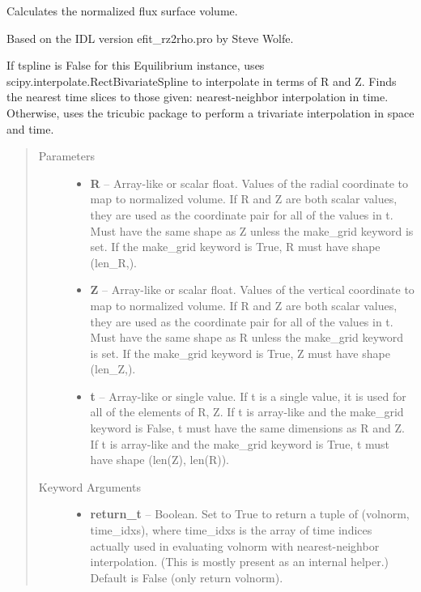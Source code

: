 \documentclass[letterpaper,10pt,english]{sphinxmanual}
\begin{document}
\begin{fulllineitems}

\begin{fulllineitems}
\label{eqtools:eqtools.core.Equilibrium.rz2volnorm}
Calculates the normalized flux surface volume.

Based on the IDL version efit\_rz2rho.pro by Steve Wolfe.

If tspline is False for this Equilibrium instance, uses
scipy.interpolate.RectBivariateSpline to interpolate in terms of R and
Z. Finds the nearest time slices to those given: nearest-neighbor
interpolation in time. Otherwise, uses the tricubic package to perform
a trivariate interpolation in space and time.
\begin{quote}\begin{description}
\item[{Parameters }] \leavevmode\begin{itemize}
\item {} 
\textbf{R} --
Array-like or scalar float. Values of the radial coordinate to
map to normalized volume. If R and Z are both scalar values,
they are used as the coordinate pair for all of the values in t.
Must have the same shape as Z unless the make\_grid keyword is
set. If the make\_grid keyword is True, R must have shape (len\_R,).

\item {} 
\textbf{Z} --
Array-like or scalar float. Values of the vertical coordinate to
map to normalized volume. If R and Z are both scalar values,
they are used as the coordinate pair for all of the values in t.
Must have the same shape as R unless the make\_grid keyword is
set. If the make\_grid keyword is True, Z must have shape (len\_Z,).

\item {} 
\textbf{t} --
Array-like or single value. If t is a single value, it is used
for all of the elements of R, Z. If t is array-like and the
make\_grid keyword is False, t must have the same dimensions as
R and Z. If t is array-like and the make\_grid keyword is True,
t must have shape (len(Z), len(R)).

\end{itemize}

\item[{Keyword Arguments}] \leavevmode\begin{itemize}
\item {} 
\textbf{return\_t} --
Boolean. Set to True to return a tuple of (volnorm,
time\_idxs), where time\_idxs is the array of time indices
actually used in evaluating volnorm with nearest-neighbor
interpolation. (This is mostly present as an internal helper.)
Default is False (only return volnorm).


\end{itemize}
\end{description}
\end{quote}
\end{fulllineitems}
\end{fulllineitems}
\end{document}
